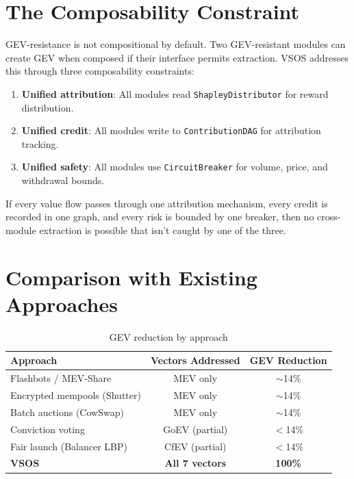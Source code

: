 \documentclass[11pt, a4paper]{article}
\begin{document}
\section{The Composability Constraint}

GEV-resistance is not compositional by default. Two GEV-resistant modules can create GEV when composed if their interface permits extraction. VSOS addresses this through three composability constraints:

\begin{enumerate}[leftmargin=*]
    \item \textbf{Unified attribution}: All modules read \texttt{ShapleyDistributor} for reward distribution.
    \item \textbf{Unified credit}: All modules write to \texttt{ContributionDAG} for attribution tracking.
    \item \textbf{Unified safety}: All modules use \texttt{CircuitBreaker} for volume, price, and withdrawal bounds.
\end{enumerate}

If every value flow passes through one attribution mechanism, every credit is recorded in one graph, and every risk is bounded by one breaker, then no cross-module extraction is possible that isn't caught by one of the three.

\section{Comparison with Existing Approaches}

\begin{table}[h]
\centering
\caption{GEV reduction by approach}
\label{tab:comparison}
\begin{tabular}{@{}lcc@{}}
\toprule
\textbf{Approach} & \textbf{Vectors Addressed} & \textbf{GEV Reduction} \\
\midrule
Flashbots / MEV-Share & MEV only & $\sim$14\% \\
Encrypted mempools (Shutter) & MEV only & $\sim$14\% \\
Batch auctions (CowSwap) & MEV only & $\sim$14\% \\
Conviction voting & GoEV (partial) & $<$14\% \\
Fair launch (Balancer LBP) & CfEV (partial) & $<$14\% \\
\textbf{VSOS} & \textbf{All 7 vectors} & \textbf{100\%} \\
\bottomrule
\end{tabular}
\end{table}
\end{document}
